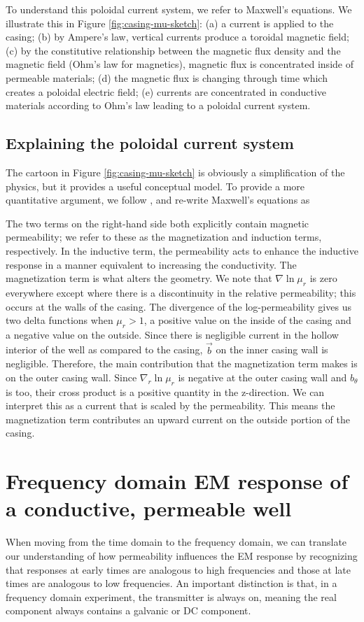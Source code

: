 To understand this poloidal current system, we refer to Maxwell's equations. We illustrate this in Figure \ref{fig:casing-mu-sketch}: (a) a current is applied to the casing; (b) by Ampere's law, vertical currents produce a toroidal magnetic field; (c) by the constitutive relationship between the magnetic flux density and the magnetic field (Ohm's law for magnetics), magnetic flux is concentrated inside of permeable materials; (d) the magnetic flux is changing through time which creates a poloidal electric field; (e) currents are concentrated in conductive materials according to Ohm's law leading to a poloidal current system.





\subsection{Explaining the poloidal current system}
The cartoon in Figure \ref{fig:casing-mu-sketch} is obviously a simplification of the physics, but it provides a useful conceptual model. To provide a more quantitative argument, we follow \cite{Pavlov2001, Noh2016}, and re-write Maxwell's equations as

The two terms on the right-hand side both explicitly contain magnetic permeability; we refer to these as the magnetization and induction terms, respectively. In the inductive term, the permeability acts to enhance the inductive response in a manner equivalent to increasing the conductivity. The magnetization term is what alters the geometry. We note that $\nabla \ln \mu_r$ is zero everywhere except where there is a discontinuity in the relative permeability; this occurs at the walls of the casing. The divergence of the log-permeability gives us two delta functions when $\mu_r > 1$, a positive value on the inside of the casing and a negative value on the outside. Since there is negligible current in the hollow interior of the well as compared to the casing, $\vec{b}$ on the inner casing wall is negligible. Therefore, the main contribution that the magnetization term makes is on the outer casing wall. Since $\nabla_r \ln \mu_r$ is negative at the outer casing wall and $b_\theta$ is too, their cross product is a positive quantity in the z-direction. We can interpret this as a current that is scaled by the permeability. This means the magnetization term contributes an upward current on the outside portion of the casing.

\section{Frequency domain EM response of a conductive, permeable well}
When moving from the time domain to the frequency domain, we can translate our understanding of how permeability influences the EM response by recognizing that responses at early times are analogous to high frequencies and those at late times are analogous to low frequencies. An important distinction is that, in a frequency domain experiment, the transmitter is always on, meaning the real component always contains a galvanic or DC component.

